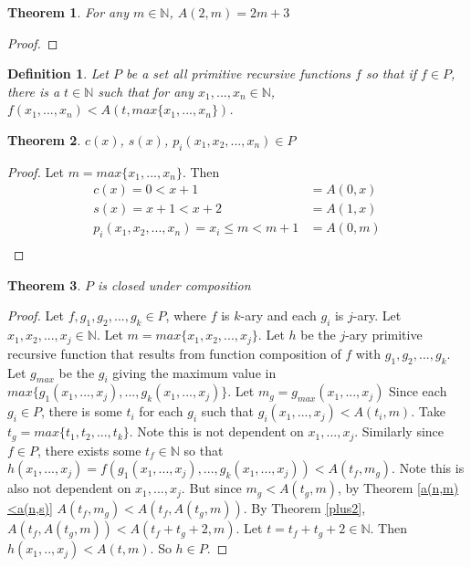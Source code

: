 \documentclass[12pt, letterpaper]{article}
\newtheorem{theorem}{Theorem}
\newtheorem*{definition}{Definition}
\theoremstyle{case}
\begin{document}
    \begin{theorem}
      \label{a(2,m)=2m+3}
      For any $m \in \mathbb{N}$, $A(2, m) = 2m + 3$
    \end{theorem}
    \begin{proof}
      
    \end{proof}

    
    \begin{definition}
      Let $P$ be a set all primitive recursive functions $f$ so that if $f \in P$, there is a $t \in \mathbb{N}$
      such that for any $x_1, ..., x_n \in \mathbb{N}$, $f(x_1, ..., x_n) < A(t, max\{x_1, ..., x_n\})$.
    \end{definition}

    \begin{theorem}
      $c(x)$, $s(x)$, $p_i(x_1, x_2, ..., x_n) \in P$
    \end{theorem}
    \begin{proof}
      Let $m = max\{x_1, ..., x_n\}$.
      Then
      \begin{equation*}
        \begin{aligned}
          c(x) = 0 < x + 1 &= A(0, x) \\
          s(x) = x + 1 < x + 2 &= A(1, x) \\
          p_i(x_1, x_2, ..., x_n) = x_i \leq m < m + 1 &= A(0, m) \\
        \end{aligned}
      \end{equation*}
    \end{proof}

    \begin{theorem}
      $P$ is closed under composition
    \end{theorem}
    \begin{proof}
      Let $f, g_1, g_2, ..., g_k \in P$, where $f$ is $k$-ary and each $g_i$ is $j$-ary.
      Let $x_1, x_2, ..., x_j \in \mathbb{N}$.
      Let $m = max\{x_1, x_2, ..., x_j\}$.
      Let $h$ be the $j$-ary primitive recursive function that results from function composition of $f$ with $g_1, g_2, ..., g_k$.
      Let $g_{max}$ be the $g_i$ giving the maximum value in $max\{g_1(x_1, ..., x_j), ..., g_k(x_1, ..., x_j)\}$.
      Let $m_g = g_{max}(x_1, ..., x_j)$
      Since each $g_i \in P$, there is some $t_i$ for each $g_i$ such that $g_i(x_1, ..., x_j) < A(t_i, m)$.
      Take $t_g = max\{t_1, t_2, ..., t_k\}$. Note this is not dependent on $x_1, ..., x_j$.
      Similarly since $f \in P$, there exists some $t_f \in \mathbb{N}$ so that $h(x_1, ..., x_j) = f(g_1(x_1, ..., x_j), ..., g_k(x_1, ..., x_j)) < A(t_f, m_g)$.
      Note this is also not dependent on $x_1, ..., x_j$.
      But since $m_g < A(t_g, m)$, by Theorem \ref{a(n,m)<a(n,s)} $A(t_f, m_g) < A(t_f, A(t_g, m))$.
      By Theorem \ref{plus2}, $A(t_f, A(t_g, m)) < A(t_f + t_g + 2, m)$.
      Let $t = t_f + t_g + 2 \in \mathbb{N}$.
      Then $h(x_1, .., x_j) < A(t, m)$.
      So $h \in P$.
    \end{proof}
\end{document}
